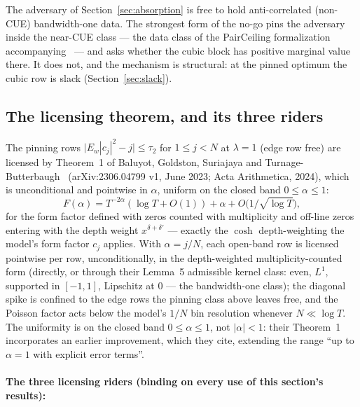 \documentclass[11pt]{article}
\theoremstyle{plain}
\theoremstyle{definition}
\theoremstyle{remark}
\begin{document}
The adversary of Section~\ref{sec:absorption} is free to hold
anti-correlated (non-CUE) bandwidth-one data. The strongest form of the no-go
pins the adversary inside the near-CUE class --- the data class of the
PairCeiling formalization accompanying~\cite{AF26} --- and asks whether the
cubic block has positive marginal value there. It does not, and the mechanism
is structural: at the pinned optimum the cubic row is slack
(Section~\ref{sec:slack}).

\subsection{The licensing theorem, and its three riders}
\label{sec:license}

The pinning rows $\bigl| E_w |c_j|^2 - j \bigr| \le \tau_2$ for
$1 \le j < N$ at $\lambda = 1$ (edge row free) are licensed by Theorem~1 of
Baluyot, Goldston, Suriajaya and Turnage-Butterbaugh~\cite{BGSTB24}
(arXiv:2306.04799 v1, June 2023; Acta Arithmetica, 2024), which is
unconditional and pointwise in $\alpha$, uniform on the closed band
$0 \le \alpha \le 1$:
\[
  F(\alpha) = T^{-2\alpha}(\log T + O(1)) + \alpha
    + O\bigl(1/\sqrt{\log T}\bigr),
\]
for the form factor defined with zeros counted with multiplicity and off-line
zeros entering with the depth weight $x^{\delta + \delta'}$ --- exactly the
$\cosh$ depth-weighting the model's form factor $c_j$ applies. With
$\alpha = j/N$, each open-band row is licensed pointwise per row,
unconditionally, in the depth-weighted multiplicity-counted form (directly, or
through their Lemma~5 admissible kernel class: even, $L^1$, supported in
$[-1, 1]$, Lipschitz at $0$ --- the bandwidth-one class); the diagonal spike is
confined to the edge rows the pinning class above leaves free, and the Poisson
factor acts below
the model's $1/N$ bin resolution whenever $N \ll \log T$. The uniformity is on
the closed band $0 \le \alpha \le 1$, not $|\alpha| < 1$: their Theorem~1
incorporates an earlier improvement, which they cite, extending the range ``up
to $\alpha = 1$ with explicit error terms''.

\paragraph{The three licensing riders (binding on every use of this section's
results):}
\end{document}

